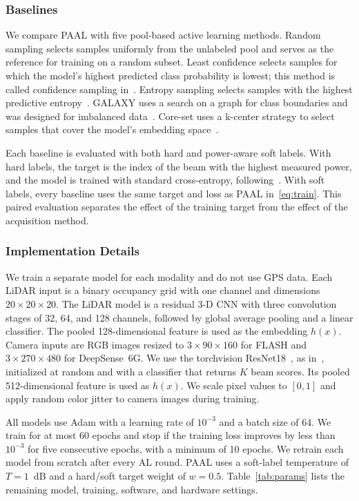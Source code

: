 \documentclass[journal,onecolumn]{IEEEtran}
\begin{document}
\subsubsection{Baselines}
We compare PAAL with five pool-based active learning methods. Random sampling selects samples uniformly from the unlabeled pool and serves as the reference for training on a random subset. Least confidence selects samples for which the model's highest predicted class probability is lowest; this method is called confidence sampling in~\cite{soltani2024learning}. Entropy sampling selects samples with the highest predictive entropy~\cite{settles2009survey}. GALAXY uses a search on a graph for class boundaries and was designed for imbalanced data~\cite{zhang2022galaxy}. Core-set uses a k-center strategy to select samples that cover the model's embedding space~\cite{sener2018coreset}.

Each baseline is evaluated with both hard and power-aware soft labels. With hard labels, the target is the index of the beam with the highest measured power, and the model is trained with standard cross-entropy, following~\cite{soltani2024learning}. With soft labels, every baseline uses the same target and loss as PAAL in~\eqref{eq:train}. This paired evaluation separates the effect of the training target from the effect of the acquisition method.

\subsubsection{Implementation Details}
We train a separate model for each modality and do not use GPS data. Each LiDAR input is a binary occupancy grid with one channel and dimensions $20 \times 20 \times 20$. The LiDAR model is a residual 3-D CNN with three convolution stages of 32, 64, and 128 channels, followed by global average pooling and a linear classifier. The pooled 128-dimensional feature is used as the embedding $h(x)$. Camera inputs are RGB images resized to $3 \times 90 \times 160$ for FLASH and $3 \times 270 \times 480$ for DeepSense~6G. We use the torchvision ResNet18~\cite{he2016resnet}, as in~\cite{soltani2024learning}, initialized at random and with a classifier that returns $K$ beam scores. Its pooled 512-dimensional feature is used as $h(x)$. We scale pixel values to $[0,1]$ and apply random color jitter to camera images during training.

All models use Adam with a learning rate of $10^{-3}$ and a batch size of 64. We train for at most 60 epochs and stop if the training loss improves by less than $10^{-3}$ for five consecutive epochs, with a minimum of 10 epochs. We retrain each model from scratch after every AL round. PAAL uses a soft-label temperature of $T=1$~dB and a hard/soft target weight of $w=0.5$. Table~\ref{tab:params} lists the remaining model, training, software, and hardware settings.
\end{document}
